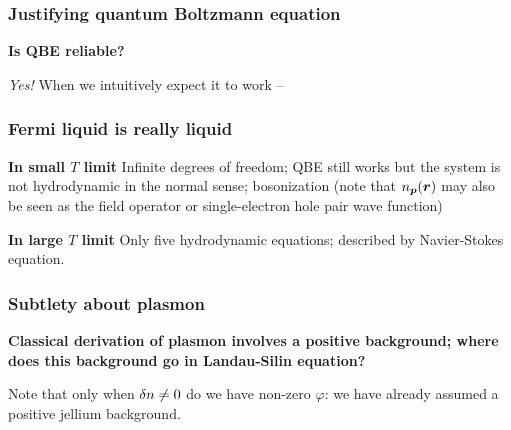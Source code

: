 \documentclass{beamer}
\begin{document}
\begin{frame}
\frametitle{Justifying quantum Boltzmann equation}

\textbf{Is QBE reliable?}

\emph{Yes!} When we intuitively expect it to work --

\begin{center}
    
\end{center}

\end{frame}

\begin{frame}
\frametitle{Fermi liquid is really liquid}

\textbf{In small $T$ limit} Infinite degrees of freedom; 
QBE still works but the system is not hydrodynamic in the normal sense;
bosonization (note that $n_{\vb*{p}}(\vb*{r})$ may also be seen as the field operator
or single-electron hole pair wave function) 

\vspace{0.5cm}

\textbf{In large $T$ limit} Only five hydrodynamic equations; described by Navier-Stokes equation.

\end{frame}

\begin{frame}
    \frametitle{Subtlety about plasmon}

    \textbf{Classical derivation of plasmon involves a positive background; 
    where does this background go in Landau-Silin equation?}
    
    Note that only when $\var{n} \neq 0$ do we have non-zero $\varphi$: 
    we have already assumed a positive jellium background.
\end{frame}
\end{document}
